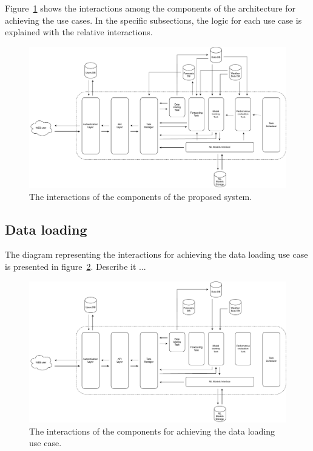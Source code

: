 Figure~\ref{fig:interactions} shows the interactions among the components of the architecture for achieving the use cases.
In the specific subsections, the logic for each use case is explained with the relative interactions.

\begin{figure}[H]
\centering
\includegraphics[width=1\textwidth]{images/architecture_interactions}
\caption{The interactions of the components of the proposed system.}
\label{fig:interactions}
\end{figure}


\vspace{0.1 cm}
\subsection{Data loading}
\label{sec:loading}
\vspace{0.1 cm}

The diagram representing the interactions for achieving the data loading use case is presented in figure~\ref{fig:loadinginteractions}.
Describe it ...

\begin{figure}[H]
\centering
\includegraphics[width=1\textwidth]{images/architecture_data_loading_interactions}
\caption{The interactions of the components for achieving the data loading use case.}
\label{fig:loadinginteractions}
\end{figure}

